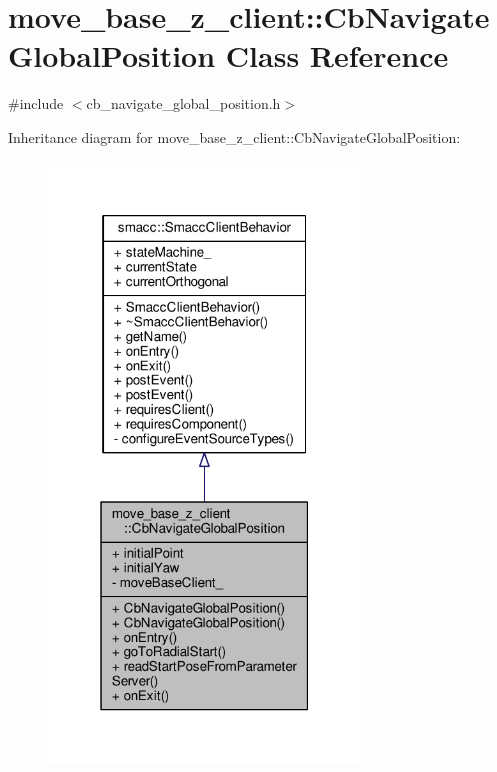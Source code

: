 \hypertarget{classmove__base__z__client_1_1CbNavigateGlobalPosition}{}\section{move\+\_\+base\+\_\+z\+\_\+client\+:\+:Cb\+Navigate\+Global\+Position Class Reference}
\label{classmove__base__z__client_1_1CbNavigateGlobalPosition}


{\ttfamily \#include $<$cb\+\_\+navigate\+\_\+global\+\_\+position.\+h$>$}



Inheritance diagram for move\+\_\+base\+\_\+z\+\_\+client\+:\+:Cb\+Navigate\+Global\+Position\+:\nopagebreak
\begin{figure}[H]
\begin{center}
\leavevmode
\includegraphics[width=235pt]{classmove__base__z__client_1_1CbNavigateGlobalPosition__inherit__graph}
\end{center}
\end{figure}


